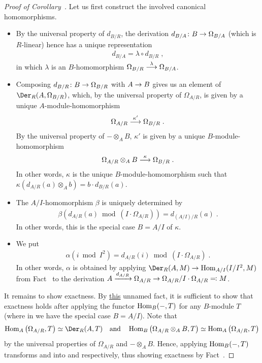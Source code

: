\documentclass[a4paper,parskip=half,numbers=enddot, DIV=12]{scrreprt}
\begin{document}
\begin{proof}[Proof of Corollary~]
	Let us first construct the involved canonical homomorphisms.
	\begin{itemize}
		\item 
		By the universal property of $d_{B/R}$, the derivation $d_{B/A}\colon B\morphism \Omega_{B/A}$ (which is $R$-linear) hence has a unique representation 
		\begin{align*}
			d_{B/A} = \lambda \circ d_{B/R}\;,
		\end{align*}
		in which $\lambda$ is an $B$-homomorphism $\Omega_{B/R}\morphism[\lambda]\Omega_{B/A}$.
		 \item 
		 Composing $d_{B/R}\colon B \morphism \Omega_{B/R}$ with $A\morphism B$ gives us an element of $\Der_R(A, \Omega_{B/R})$, which, by the universal property of $\Omega_{A/R}$, is given by a unique $A$-module-homomorphism 
		 \begin{align*}
		 	\Omega_{A/R} \morphism[\kappa'] \Omega_{B/R}\;.
		 \end{align*}
		 By the universal property of $-\otimes_A B$, $\kappa'$ is given by a unique $B$-module-homomorphism
		 \begin{align*}
		 	\Omega_{A/R} \otimes_A B \morphism[\kappa] \Omega_{B/R}\;.
		 \end{align*}
		 In other words, $\kappa$ is the unique $B$-module-homomorphism such that $\kappa(d_{A/R}(a)\otimes_A b) = b\cdot d_{B/R}(a)$.
		 \item 
		 The $A/I$-homomorphism $\beta$ is uniquely determined by 
		 \begin{align*}
		 	\beta\left(d_{A/R}(a) \bmod (I\cdot \Omega_{A/R})\right) = d_{(A/I)/R}(a)\;.
		 \end{align*}
		 In other words, this is the special case $B=A/I$ of $\kappa$.
		 \item 
		 We put 
		 \begin{align*}
		 	\alpha(i\bmod I^2) = d_{A/R}(i) \bmod (I\cdot \Omega_{A/R})\;.
		 \end{align*}
		 In other words, $\alpha$ is obtained by applying $\Der_R(A,M) \morphism \Hom_{A/I} (I/I^2, M)$ from Fact~ to the derivation $A\xrightarrow{\smash{d}_{A/R}} \Omega_{A/R} \morphism \Omega_{A/R}/I \cdot \Omega_{A/R} \eqqcolon M$.
	\end{itemize}
	It remains to show exactness. By \hyperref[fact:HomRightExact]{this} unnamed fact, it is sufficient to show that exactness holds after applying the functor $\operatorname{Hom}_B(-,T)$ for any $B$-module $T$ (where in  we have the special case $B=A/I$). Note that 
	\begin{align*}
		\Hom_A\left(\Omega_{A/R},T\right)\simeq\Der_R(A,T)\quad\text{and}\quad \Hom_B\left(\Omega_{A/R}\otimes_AB,T\right)\simeq \Hom_A\left(\Omega_{A/R},T\right) 
	\end{align*}
	by the universal properties of $\Omega_{A/R}$ and $-\otimes_AB$. Hence, applying $\operatorname{Hom}_B(-,T)$ transforms  and  into  and  respectively, thus showing exactness by Fact~. 
\end{proof}
\end{document}
